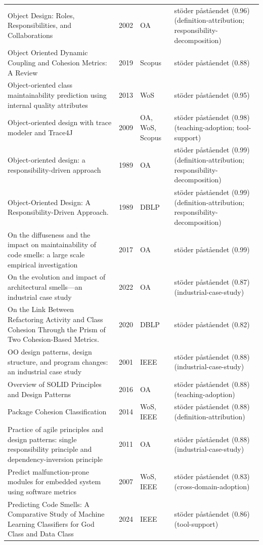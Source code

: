 \begin{longtable}{@{}%
  >{\raggedright\arraybackslash}p{}c%
  >{\raggedright\arraybackslash}p{}%
  >{\raggedright\arraybackslash}p{}@{}}
Object Design: Roles, Responsibilities, and Collaborations & 2002 & OA & stöder påståendet (0.96) (definition-attribution; responsibility-decomposition) \\
Object Oriented Dynamic Coupling and Cohesion Metrics: A Review & 2019 & Scopus & stöder påståendet (0.88) \\
Object-oriented class maintainability prediction using internal quality attributes & 2013 & WoS & stöder påståendet (0.95) \\
Object-oriented design with trace modeler and Trace4J & 2009 & OA, WoS, Scopus & stöder påståendet (0.98) (teaching-adoption; tool-support) \\
Object-oriented design: a responsibility-driven approach & 1989 & OA & stöder påståendet (0.99) (definition-attribution; responsibility-decomposition) \\
Object-Oriented Design: A Responsibility-Driven Approach. & 1989 & DBLP & stöder påståendet (0.99) (definition-attribution; responsibility-decomposition) \\
On the diffuseness and the impact on maintainability of code smells: a large scale empirical investigation & 2017 & OA & stöder påståendet (0.99) \\
On the evolution and impact of architectural smells---an industrial case study & 2022 & OA & stöder påståendet (0.87) (industrial-case-study) \\
On the Link Between Refactoring Activity and Class Cohesion Through the Prism of Two Cohesion-Based Metrics. & 2020 & DBLP & stöder påståendet (0.82) \\
OO design patterns, design structure, and program changes: an industrial case study & 2001 & IEEE & stöder påståendet (0.88) (industrial-case-study) \\
Overview of SOLID Principles and Design Patterns & 2016 & OA & stöder påståendet (0.88) (teaching-adoption) \\
Package Cohesion Classification & 2014 & WoS, IEEE & stöder påståendet (0.88) (definition-attribution) \\
Practice of agile principles and design patterns: single responsibility principle and dependency-inversion principle & 2011 & OA & stöder påståendet (0.88) (industrial-case-study) \\
Predict malfunction-prone modules for embedded system using software metrics & 2007 & WoS, IEEE & stöder påståendet (0.83) (cross-domain-adoption) \\
Predicting Code Smells: A Comparative Study of Machine Learning Classifiers for God Class and Data Class & 2024 & IEEE & stöder påståendet (0.86) (tool-support) \\

\end{longtable}
